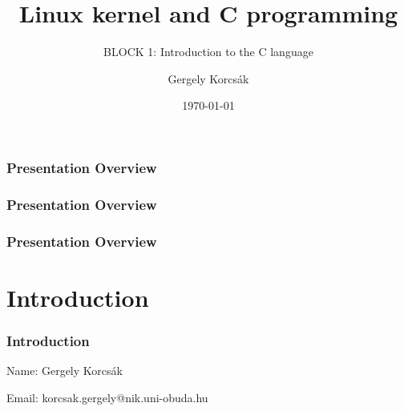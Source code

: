 \documentclass[
	11pt, %
]{beamer}
\title[Linux kernel and C programming]{Linux kernel and C programming}
\subtitle{BLOCK 1: Introduction to the C language}
\author[Gergely Korcsák]{Gergely Korcsák}
\institute[OE NIK]{Óbuda University \\ \smallskip \textit{korcsak.gergely@nik.uni-obuda.hu}}
\date[\today]{\today}
\begin{document}

\begin{frame}
	\titlepage
\end{frame}


\begin{frame}
	\frametitle{Presentation Overview} %

	\tableofcontents[pausesections,sections={1}] %
\end{frame}

\begin{frame}
	\frametitle{Presentation Overview}
	\tableofcontents[pausesections,sections={2}]
\end{frame}

\begin{frame}
	\frametitle{Presentation Overview}
	\tableofcontents[pausesections,sections={3}]
	\tableofcontents[pausesections,sections={4}]
\end{frame}


\section{Introduction}

\begin{frame}
	\frametitle{Introduction}

    Name:  Gergely Korcsák

	\bigskip %

    Email: korcsak.gergely@nik.uni-obuda.hu

\end{frame}
\end{document}
